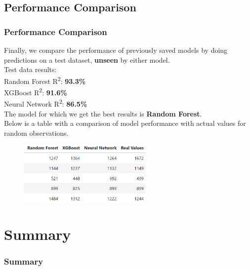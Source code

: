 \documentclass[8pt]{beamer}
\begin{document}
\subsection{Performance Comparison}
\begin{frame}
\frametitle{Performance Comparison}
Finally, we compare the performance of previously saved models by doing predictions on a test dataset, \textbf{unseen} by either model.\\
\vspace{2mm}
Test data results:\\
Random Forest R\textsuperscript{2}: \textbf{93.3\%}\\
XGBoost R\textsuperscript{2}: \textbf{91.6\%}\\
Neural Network R\textsuperscript{2}: \textbf{86.5\%}\\
\vspace{2mm}
The model for which we get the best results is \textbf{Random Forest}.\\
\vspace{2mm}
Below is a table with a comparison of model performance with actual values for random observations.
\begin{figure}[t]
\includegraphics[width=6.5cm]{regression_final_performance_table.png}
\centering
\end{figure}
\end{frame}


\section{Summary}

\begin{frame}
\frametitle{Summary}

\end{frame}
\end{document}

